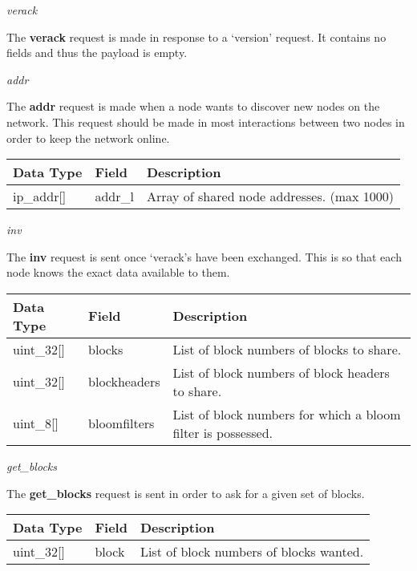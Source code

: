 \documentclass{article}
\begin{document}
\begin{center}
    \large \textit{verack}
\end{center}
The \textbf{verack} request is made in response to a `version' request. It contains no fields and thus the payload is empty.

\begin{center}
    \large \textit{addr}
\end{center}
The \textbf{addr} request is made when a node wants to discover new nodes on the network. This request should be made in most interactions between two nodes in order to keep the network online.
\begin{table}[H]
\centering
\begin{tabular}{|p{1.5cm}|p{2.5cm}|p{5.5cm}|}
\hline
\rowcolor{tblgrey}
Data Type   & Field       & Description\\ \hline
ip\_addr[\hspace{0.05cm}] & addr\_l       & Array of shared node addresses. (max 1000)                               \\ \hline
\end{tabular}
\end{table}

\begin{center}
    \large \textit{inv}
\end{center}
The \textbf{inv} request is sent once `verack's have been exchanged. This is so that each node knows the exact data available to them.
\begin{table}[H]
\centering
\begin{tabular}{|p{1.5cm}|p{2.5cm}|p{5.5cm}|}
\hline
\rowcolor{tblgrey}
Data Type   & Field       & Description\\ \hline
uint\_32[\hspace{0.05cm}] & blocks & List of block numbers of blocks to share.                    \\ \hline
uint\_32[\hspace{0.05cm}] & blockheaders & List of block numbers of block headers to share.                    \\ \hline
uint\_8[\hspace{0.05cm}]  & bloomfilters & List of block numbers for which a bloom filter is possessed.        \\ \hline
\end{tabular}
\end{table}

\begin{center}
    \large \textit{get\_blocks}
\end{center}
The \textbf{get\_blocks} request is sent in order to ask for a given set of blocks.
\begin{table}[H]
\centering
\begin{tabular}{|p{1.5cm}|p{2.5cm}|p{5.5cm}|}
\hline
\rowcolor{tblgrey}
Data Type   & Field       & Description\\ \hline
uint\_32[\hspace{0.05cm}] & block & List of block numbers of blocks wanted.                    \\ \hline
\end{tabular}
\end{table}
\end{document}
